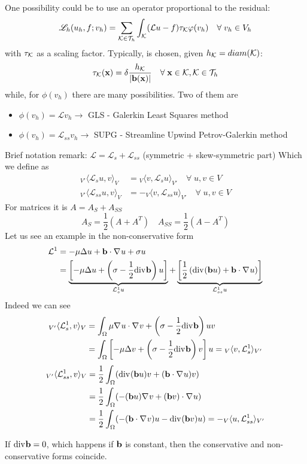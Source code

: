 One possibility could be to use an operator proportional to the residual:
\[
    \mathscr{L}_h(u_h, f;v_h) = \sum_{\mathcal{K} \in \mathcal{T}_h} \int_{\mathcal{K}}(\mathcal{L}u - f)\tau_{\mathcal{K}} \varphi(v_h) \quad \forall \; v_h \in V_h  
\]
with \(\tau_{\mathcal{K}}\) as a scaling factor. Typically, is chosen, given \(h_{\mathcal{K}} = diam(\mathcal{K})\):
\[
    \tau_{\mathcal{K}} (\textbf{x}) = \delta \frac{h_{\mathcal{K}}}{\abs{\textbf{b}(\textbf{x})}} \quad \forall \; \textbf{x} \in \mathcal{K}, \mathcal{K} \in \mathcal{T}_h
\]
while, for \(\phi(v_h)\) there are many possibilities. Two of them are 
\begin{itemize}
    \item \(\phi(v_h) = \mathcal{L}v_h \rightarrow\) GLS - Galerkin Least Squares method
    \item \(\phi(v_h) = \mathcal{L}_{ss}v_h \rightarrow\) SUPG - Streamline Upwind Petrov-Galerkin method
\end{itemize}
Brief notation remark: \(\mathcal{L} = \mathcal{L}_s +\mathcal{L}_{ss}\) (symmetric + skew-symmetric part)
Which we define as 
\begin{align*}
    {}_{V'}\langle\mathcal{L}_su, v \rangle_{V} &= {}_{V}\langle v, \mathcal{L}_su \rangle_{V'}  \quad \forall \; u, v \in V \\
    {}_{V'}\langle\mathcal{L}_{ss}u, v \rangle_V &= -{}_{V}\langle v, \mathcal{L}_{ss}u \rangle_{V'} \quad \forall \; u, v \in V 
\end{align*}
For matrices it is \(A = A_S + A_{SS}\) 
\[
  A_S = \frac{1}{2} (A + A^T) \quad A_{SS} = \frac{1}{2} (A -A^T)
\]
Let us see an example in the non-conservative form 
\begin{align*}
        \mathcal{L}^1 &= -\mu \Delta u + \textbf{b} \cdot \nabla\mspace{1mu} u + \sigma u \\
        &= \underbrace{\left[ -\mu \Delta u + \left( \sigma - \frac{1}{2} \text{div}\mspace{1mu} \textbf{b} \right)u\right]}_{\mathcal{L}^1_s u} + \underbrace{\left[ \frac{1}{2} \left( \text{div}\mspace{1mu}(\textbf{b}u) + \textbf{b} \cdot \nabla\mspace{1mu} u \right) \right]}_{\mathcal{L}^1_{ss}u}
\end{align*}
Indeed we can see
\begin{align*}
    {}_{V'}\langle \mathcal{L}^1_s, v \rangle_V &= \int_\Omega \mu \nabla\mspace{1mu} u \cdot \nabla\mspace{1mu} v + \left( \sigma - \frac{1}{2} \text{div}\mspace{1mu} \textbf{b} \right) u v \\
    &= \int_\Omega \left[ -\mu \Delta v + \left( \sigma - \frac{1}{2} \text{div}\mspace{1mu} \textbf{b} \right) v \right] u = {}_{V}\langle v, \mathcal{L}^1_s \rangle_{V'}
\end{align*}
\begin{align*}
    {}_{V'}\langle \mathcal{L}^1_{ss}, v \rangle_V &= \frac{1}{2} \int_\Omega (\text{div}\mspace{1mu}(\textbf{b}u)v+(\textbf{b} \cdot \nabla\mspace{1mu} u)v) \\
    &= \frac{1}{2} \int_\Omega (-(\textbf{b}u) \nabla\mspace{1mu} v + (\textbf{b}v) \cdot \nabla\mspace{1mu} u) \\
    &= \frac{1}{2} \int_\Omega (-(\textbf{b}\cdot \nabla\mspace{1mu} v)u - \text{div}\mspace{1mu}(\textbf{b}v)u) = -{}_V\langle u, \mathcal{L}_{ss}^1 \rangle_{V'}
\end{align*}
\begin{remark}
    If \(\text{div}\mspace{1mu} \textbf{b} = 0\), which happens if \(\textbf{b}\) is constant, then the conservative and non-conservative forms coincide.
\end{remark}
